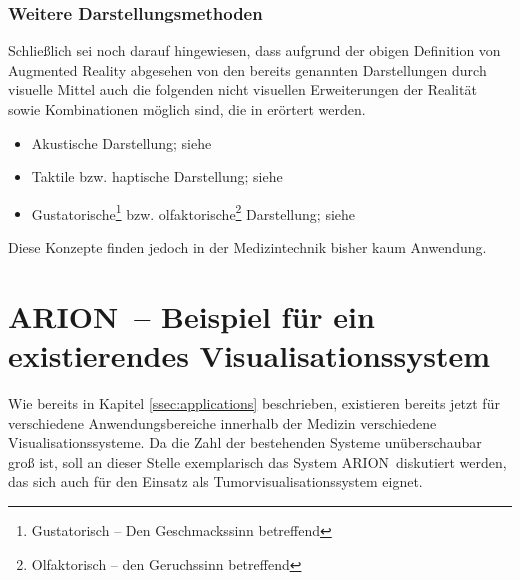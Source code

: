 \documentclass[ngerman,pdftex,paper=A4,DIV=calc,titlepage,12pt]{scrartcl}
\newtheorem[L]{boxedDefinition}{Definition}
\begin{document}
\subsubsection{Weitere Darstellungsmethoden}
Schließlich sei noch darauf hingewiesen, dass aufgrund der obigen Definition von Augmented Reality abgesehen von den bereits genannten Darstellungen durch visuelle Mittel auch die folgenden nicht visuellen Erweiterungen der Realität sowie Kombinationen möglich sind, die in \cite[Kapitel 2.4, Seite 36-41]{Toe2010} erörtert werden. 
\begin{itemize}
 \item Akustische Darstellung; siehe \cite[Seite 37]{Toe2010}
 \item Taktile bzw. haptische Darstellung; siehe \cite[Seite 38f.]{Toe2010}
 \item Gustatorische\footnote{Gustatorisch -- Den Geschmackssinn betreffend} bzw. olfaktorische\footnote{Olfaktorisch -- den Geruchssinn betreffend} Darstellung; siehe \cite[Seite 39-41]{Toe2010}
\end{itemize}
Diese Konzepte finden jedoch in der Medizintechnik bisher kaum Anwendung.

\section{ARION\texttrademark\ -- Beispiel für ein existierendes Visualisationssystem}\label{sec:arion}
Wie bereits in Kapitel \vref{ssec:applications} beschrieben, existieren bereits jetzt für verschiedene Anwendungsbereiche innerhalb der Medizin verschiedene Visualisationssysteme. Da die Zahl der bestehenden Systeme unüberschaubar groß ist, soll an dieser Stelle exemplarisch das System ARION\texttrademark\ diskutiert werden, das sich auch für den Einsatz als Tumorvisualisationssystem eignet.
\end{document}
